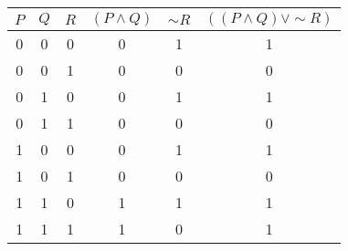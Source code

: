 \begin{tabular}{|c|c|c||c|c|c|}
\hline
$ P $ & $ Q $ & $ R $ & $ (P \wedge Q) $ & $  \sim R $ & $ ((P \wedge Q) \vee  \sim R) $ \\
\hline
0 & 0 & 0 & 0 & 1 & 1 \\
0 & 0 & 1 & 0 & 0 & 0 \\
0 & 1 & 0 & 0 & 1 & 1 \\
0 & 1 & 1 & 0 & 0 & 0 \\
1 & 0 & 0 & 0 & 1 & 1 \\
1 & 0 & 1 & 0 & 0 & 0 \\
1 & 1 & 0 & 1 & 1 & 1 \\
1 & 1 & 1 & 1 & 0 & 1 \\
\hline
\end{tabular}
